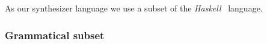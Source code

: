 \documentclass{article} %
\begin{document}


As our synthesizer language we use a subset of the \emph{Haskell}~\citep{jones2003haskell} language.

\subsubsection{Grammatical subset} \label{sec:grammar}


\end{document}
